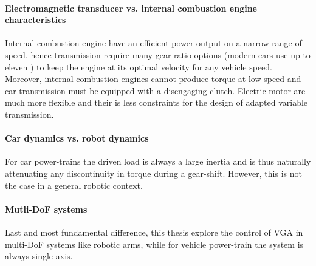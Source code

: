 
\paragraph{Electromagnetic transducer vs. internal combustion engine characteristics}
%
Internal combustion engine have an efficient power-output on a narrow range of speed, hence transmission require many gear-ratio options (modern cars use up to eleven \cite{goleski_multi-speed_2015}) to keep the engine at its optimal velocity for any vehicle speed. Moreover, internal combustion engines cannot produce torque at low speed and car transmission must be equipped with a disengaging clutch.  Electric motor are much more flexible and their is less constraints for the design of adapted variable transmission. 

\paragraph{Car dynamics vs. robot dynamics}
%
For car power-trains the driven load is always a large inertia and is thus naturally attenuating any discontinuity in torque during a gear-shift. However, this is not the case in a general robotic context. 

\paragraph{Mutli-DoF systems}
%
Last and most fundamental difference, this thesis explore the control of VGA in multi-DoF systems like robotic arms, while for vehicle power-train the system is always single-axis.

